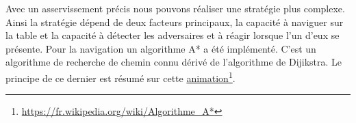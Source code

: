 \documentclass[a4paper,10pt]{article}
\begin{document}
\begin{spacing}{1.5}
Avec un asservissement précis nous pouvons réaliser une stratégie plus complexe.
Ainsi la stratégie dépend de deux facteurs principaux, la capacité à naviguer
sur la table et la capacité à détecter les adversaires et à réagir lorsque l'un
d'eux se présente. Pour la navigation un algorithme A* a été implémenté. C'est
un algorithme de recherche de chemin connu dérivé de l'algorithme de Dijikstra.
Le principe de ce dernier est résumé sur cette
\href{https://fr.wikipedia.org/wiki/Algorithme_A*#/media/Fichier:Astar_progress_animation.gif}{animation}\footnote{\url{https://fr.wikipedia.org/wiki/Algorithme_A*}}.


\end{spacing}
\end{document}
